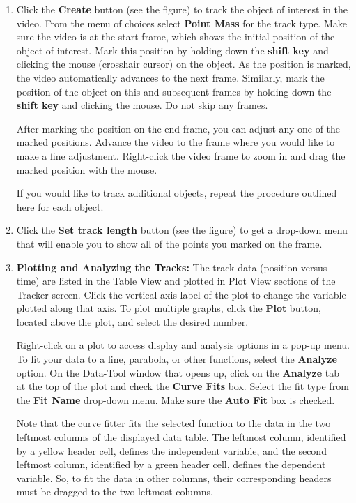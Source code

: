 \begin{enumerate}
\item Click the {\bf Create} button (see the figure) to track the object of interest in the video. 
From the menu of choices select {\bf Point Mass} for the track type. 
Make sure the video is at the start frame, which shows the initial position of the object of interest. 
Mark this position by holding down the {\bf shift key} and clicking the mouse (crosshair cursor) on the object. 
As the position is marked, the video automatically advances to the next frame. 
Similarly, mark the position of the object on this and subsequent frames by holding down the {\bf shift key} 
and clicking the mouse. 
Do not skip any frames. 

After marking the position on the end frame, you can adjust any one of the marked positions. 
Advance the video to the frame where you would like to make a fine adjustment. 
Right-click the video frame to zoom in and drag the marked position with the mouse.

If you would like to track additional objects, repeat the procedure outlined here for each object.

\item Click the {\bf Set track length} button (see the figure) to get a drop-down menu that
will enable you to show all of the points you marked on the frame.

\item {\bf Plotting and Analyzing the Tracks:} The track data (position versus time) are listed in the Table View 
and plotted in Plot View sections of the Tracker screen. 
Click the vertical axis label of the plot to change the variable plotted along that axis. 
To plot multiple graphs, click the {\bf Plot} button, located above the plot, and select the desired number. 

Right-click on a plot to access display and analysis options in a pop-up menu. 
To fit your data to a line, parabola, or other functions, select the {\bf Analyze} option. 
On the Data-Tool window that opens up, click on the {\bf Analyze} tab at the top of the plot and 
check the {\bf Curve Fits} box. Select the fit type from the {\bf Fit Name} drop-down menu.
Make sure the {\bf Auto Fit} box is checked.


Note that the curve fitter fits the selected function to the data in the two leftmost columns of the displayed data table. 
The leftmost column, identified by a yellow header cell, defines the independent variable, and the second leftmost column, 
identified by a green header cell, defines the dependent variable. 
So, to fit the data in other columns, their corresponding headers must be dragged to the two leftmost columns.


\end{enumerate}
